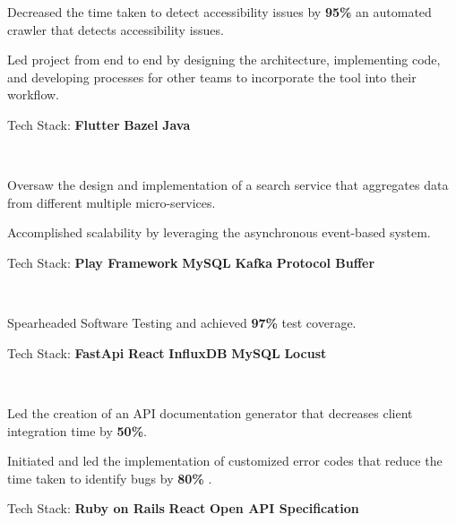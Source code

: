 \documentclass[]{Klement_Resume}
\begin{document}
\begin{minipage}[t]{1\textwidth}
    \begin{tightemize}
    \item Decreased the time taken to detect accessibility issues by {\bf 95\%} an automated crawler that detects accessibility issues.
    \item Led project from end to end by designing the architecture, implementing code, and developing processes for other teams to incorporate the tool into their workflow.
    \item Tech Stack: {\bf Flutter} \textbullet{} {\bf Bazel} \textbullet{} {\bf Java}
    \end{tightemize}
    \sectionsep


     \\
    \begin{tightemize}
    \item Oversaw the design and implementation of a search service that aggregates data from different multiple micro-services.
    \item Accomplished scalability by leveraging the asynchronous event-based system.
    \item Tech Stack: {\bf Play Framework} \textbullet{} {\bf MySQL} \textbullet{} {\bf Kafka} \textbullet{} {\bf Protocol Buffer} 
    \end{tightemize}
    \sectionsep

     \\
    \begin{tightemize}
    \item Spearheaded Software Testing and achieved {\bf97\%} test coverage. 
    \item Tech Stack: {\bf FastApi} \textbullet{} {\bf React} \textbullet{} {\bf InfluxDB} \textbullet{} {\bf MySQL} \textbullet{} {\bf Locust}
    \end{tightemize}
    \sectionsep


     \\
    \begin{tightemize}
    \item 
      Led the creation of an API documentation generator that decreases client integration time by {\bf50\%}. 
    \item
      Initiated and led the implementation of customized error codes that reduce the time taken to identify bugs by { \bf 80\% }.
    \item Tech Stack: {\bf Ruby on Rails} \textbullet{} {\bf React} \textbullet{} {\bf Open API Specification}
    \end{tightemize}
    \sectionsep

\end{minipage}
\end{document}
